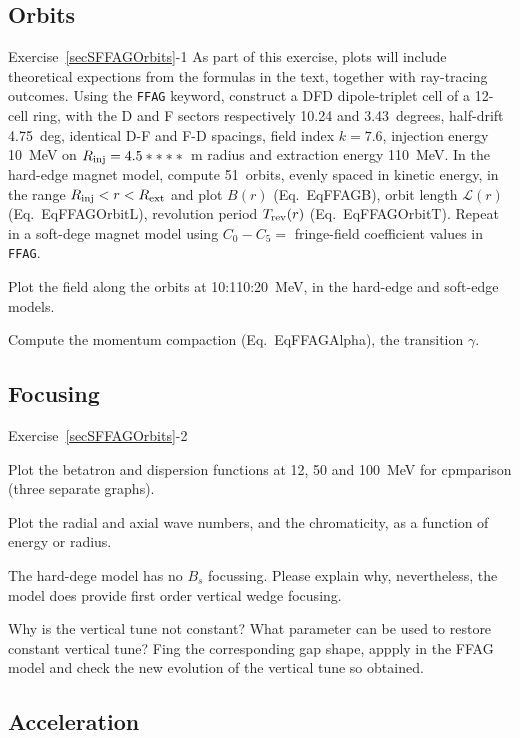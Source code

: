 \subsection{Orbits \label{secSFFAGOrbits}}



\smallskip
\noindent {\small $\bullet$} Exercise~\ref{secSFFAGOrbits}-1 
As part of  this exercise, plots will include theoretical expections from the formulas in the text, 
together with ray-tracing outcomes.
Using the \texttt{FFAG} keyword, 
construct a DFD dipole-triplet cell of a 12-cell ring, with the D and F sectors respectively 10.24 and 3.43~degrees, 
half-drift 4.75~deg, identical D-F and F-D spacings, field index $k=7.6$, 
 injection energy 10~MeV on $R_{\rm inj}=4.5****$~m radius and extraction energy 110~MeV.
In the hard-edge magnet model, 
compute 51~orbits, evenly spaced in kinetic energy, in the  range $R_{\rm inj} <r< R_{\rm ext}$ and
plot $B(r)$ (Eq.~{EqFFAGB}), orbit length $\mathcal{L}(r)$ (Eq.~{EqFFAGOrbitL}), revolution period $T_{\rm rev}(r)$ 
(Eq.~{EqFFAGOrbitT}).
Repeat in a soft-dege magnet model using $C_0-C_5 = $ fringe-field coefficient values in \texttt{FFAG}.

Plot the field along the orbits at 10:110:20~MeV, in the hard-edge and soft-edge models.

Compute the momentum compaction (Eq.~{EqFFAGAlpha}), the transition $\gamma$.


\subsection{Focusing \label{secSFFAGFocus}}

\noindent {\small $\bullet$} Exercise~\ref{secSFFAGOrbits}-2 

Plot the betatron and dispersion functions  at 12, 50 and 100~MeV for cpmparison 
(three separate graphs). 

Plot the radial and axial wave numbers, and the chromaticity, as a function of energy or radius. 

The hard-dege model has no $B_s$ focussing. Please explain why, nevertheless, the model 
does provide first order vertical wedge focusing. 

Why is the vertical tune not constant? What parameter can be used to restore constant vertical tune? 
Fing the corresponding gap shape, appply in the FFAG model and check the new evolution of the vertical 
tune so obtained. 


\subsection{Acceleration}\label{secSFFAGAccel}


